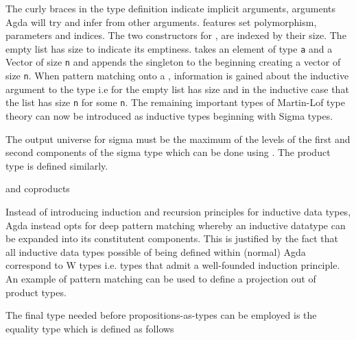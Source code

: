
The curly braces in the type definition indicate implicit arguments, arguments
Agda will try and infer from other arguments.  features set
polymorphism, parameters and indices. The two constructors for
, are indexed by their size. The empty list has size
 to indicate its emptiness.
takes an element of type \verb|a| and a Vector of size \verb|n| and appends the
singleton to the beginning creating a vector of size
 \verb|n|. When pattern matching onto a
, information is gained about the inductive argument to the
type i.e for the empty list has size  and in the
inductive case that the list has size  \verb|n|
for some \verb|n|. The remaining important types of Martin-Lof type theory can
now be introduced as inductive types beginning with Sigma types.


The output universe for sigma must be the maximum of the levels of the first and
second components of the sigma type which can be done using . The
product type is defined similarly.


and coproducts


Instead of introducing induction and recursion principles for inductive data
types, Agda instead opts for deep pattern matching whereby an inductive datatype
can be expanded into its constitutent components. This is justified by the fact
that all inductive data types possible of being defined within (normal) Agda
correspond to W types i.e. types that admit a well-founded induction principle.
An example of pattern matching can be used to define a projection out of product
types.



The final type needed before propositions-as-types can be employed is the
equality type which is defined as follows

